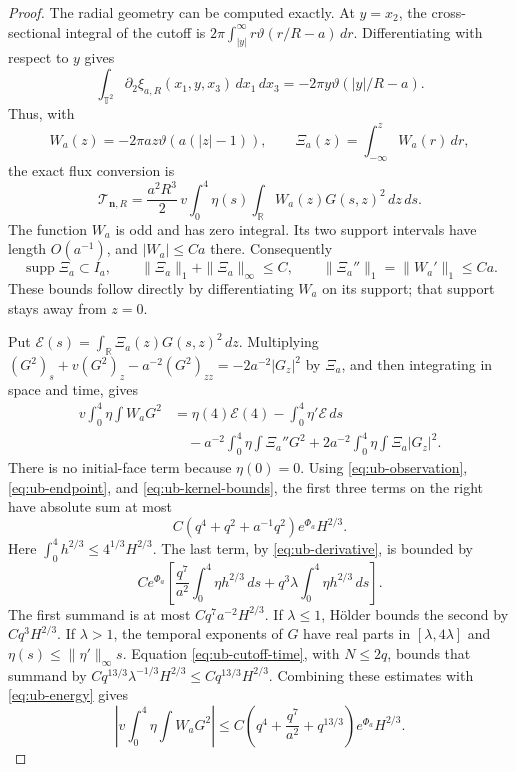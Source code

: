 \begin{proof}
The radial geometry can be computed exactly.  At $y=x_2$, the
cross-sectional integral of the cutoff is
$2\pi\int_{|y|}^\infty r\vartheta(r/R-a)\,dr$.
Differentiating with respect to $y$ gives
\[
 \int_{\mathbb T^2}\partial_2\xi_{a,R}(x_1,y,x_3)\,dx_1\,dx_3
 =-2\pi y\vartheta(|y|/R-a).
\]
Thus, with
\[
 W_a(z)=-2\pi az\vartheta(a(|z|-1)),\qquad
 \Xi_a(z)=\int_{-\infty}^zW_a(r)\,dr,
\]
the exact flux conversion is
\begin{equation}\label{eq:ub-flux-conversion}
 \mathcal T_{\boldsymbol n,R}
 =\frac{a^2R^3}{2}\,v\int_0^4\eta(s)
                         \int_{\mathbb R}W_a(z)G(s,z)^2\,dz\,ds.
\end{equation}
The function $W_a$ is odd and has zero integral.  Its two support
intervals have length $O(a^{-1})$, and $|W_a|\le Ca$ there.  Consequently
\begin{equation}\label{eq:ub-kernel-bounds}
 \operatorname{supp}\Xi_a\subset I_a,\qquad
 \|\Xi_a\|_1+\|\Xi_a\|_\infty\le C,\qquad
 \|\Xi_a''\|_1=\|W_a'\|_1\le Ca.
\end{equation}
These bounds follow directly by differentiating $W_a$ on its support;
that support stays away from $z=0$.

Put $\mathcal E(s)=\int_{\mathbb R}\Xi_a(z)G(s,z)^2\,dz$.
Multiplying
$(G^2)_s+v(G^2)_z-a^{-2}(G^2)_{zz}=-2a^{-2}|G_z|^2$
by $\Xi_a$, and then integrating in space and time, gives
\begin{align}
 v\int_0^4\eta\int W_aG^2
 &=\eta(4)\mathcal E(4)-\int_0^4\eta'\mathcal E\,ds
 \nonumber\\
 &\quad-a^{-2}\int_0^4\eta\int\Xi_a''G^2
       +2a^{-2}\int_0^4\eta\int\Xi_a|G_z|^2.
 \label{eq:ub-energy}
\end{align}
There is no initial-face term because $\eta(0)=0$.
Using \eqref{eq:ub-observation}, \eqref{eq:ub-endpoint}, and
\eqref{eq:ub-kernel-bounds}, the first three terms on the right have
absolute sum at most
\begin{equation}\label{eq:ub-first-rows}
 C(q^4+q^2+a^{-1}q^2)e^{\Phi_a}H^{2/3}.
\end{equation}
Here $\int_0^4h^{2/3}\le4^{1/3}H^{2/3}$.
The last term, by \eqref{eq:ub-derivative}, is bounded by
\[
 Ce^{\Phi_a}\left[
       \frac{q^7}{a^2}\int_0^4\eta h^{2/3}\,ds
       +q^3\lambda\int_0^4\eta h^{2/3}\,ds\right].
\]
The first summand is at most $Cq^7a^{-2}H^{2/3}$.
If $\lambda\le1$, H\"older bounds the second by $Cq^3H^{2/3}$.
If $\lambda>1$, the temporal exponents of $G$ have real parts in
$[\lambda,4\lambda]$ and $\eta(s)\le\|\eta'\|_\infty s$.
Equation \eqref{eq:ub-cutoff-time}, with $N\le2q$, bounds that summand
by $Cq^{13/3}\lambda^{-1/3}H^{2/3}\le Cq^{13/3}H^{2/3}$.
Combining these estimates with \eqref{eq:ub-energy} gives
\begin{equation}\label{eq:ub-scaled-bound}
 \left|v\int_0^4\eta\int W_aG^2\right|
 \le C\left(q^4+\frac{q^7}{a^2}+q^{13/3}\right)
                  e^{\Phi_a}H^{2/3}.
\end{equation}


\end{proof}
